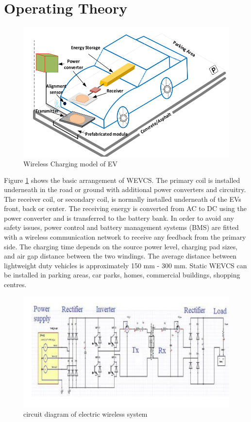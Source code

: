 \documentclass[12pt]{article}
\begin{document}
\newpage

\section{Operating Theory}
\begin{figure}[h]
	\centering
	\includegraphics[scale =0.75]{static.png}
	\caption{Wireless Charging model of EV}
	\label{fig:WEV}
\end{figure}
Figure \ref{fig:WEV} shows the basic arrangement of WEVCS. The primary coil is installed underneath in the road or ground with additional power converters and circuitry. The receiver coil, or secondary coil, is normally installed underneath of the EVs front, back
or center. The receiving energy is converted from AC to DC using the power converter and is transferred to the battery bank. In order to avoid any safety issues, power control and battery management systems (BMS) are fitted with a wireless communication network to receive any feedback from the primary side. The charging time depends on the source power level, charging pad sizes, and air gap distance between the two windings. The average distance between lightweight duty vehicles is approximately 150 mm - 300 mm. Static WEVCS can be installed in parking areas, car parks, homes, commercial buildings, shopping centres. \cite{pl2018}
\begin{figure}[h]
	\centering
	\includegraphics{circuit.png}
	\caption{circuit diagram of electric wireless system}
	\label{fig:ckt}
\end{figure}
 \newpage 
  


\end{document}
